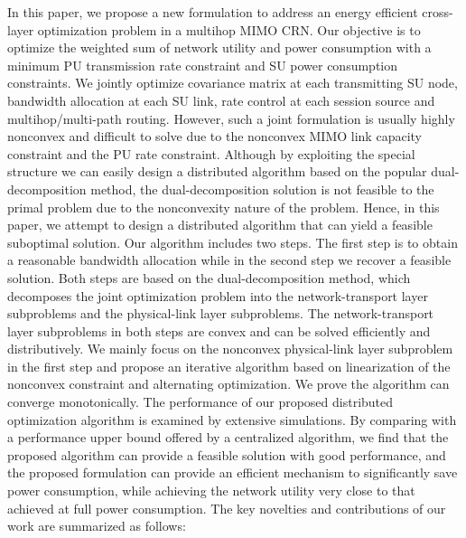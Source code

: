 \documentclass[12pt,onecolumn,tworows]{IEEEtran}
\begin{document}
In this paper, we propose a new formulation to address an energy efficient cross-layer optimization problem in a multihop MIMO CRN. Our objective is to optimize the weighted sum of network utility and power consumption with a minimum PU transmission rate constraint and SU power consumption constraints.
We jointly optimize covariance matrix
at each transmitting SU node, bandwidth allocation
at each SU link, rate control at each session source and multihop/multi-path routing. However, such a joint formulation is usually highly nonconvex and difficult to solve due to the nonconvex MIMO link capacity constraint and the PU rate constraint. Although by exploiting the special structure we can easily design a distributed algorithm based on the popular dual-decomposition method, the dual-decomposition solution is not feasible to the primal problem due to the nonconvexity nature of the problem. Hence, in this paper, we attempt to design a distributed algorithm that can yield a feasible suboptimal solution. Our algorithm includes two steps. The first step is to obtain a reasonable bandwidth allocation while in the second step we recover a feasible solution. Both steps are based on the dual-decomposition method, which decomposes the joint optimization problem into the network-transport layer subproblems and the physical-link layer subproblems. The network-transport layer subproblems in both steps are convex and can be solved efficiently and distributively. We mainly focus on the nonconvex physical-link layer subproblem in the first step and propose an iterative algorithm based on linearization of the nonconvex constraint and alternating optimization. We prove the algorithm can converge monotonically. The performance of our proposed distributed optimization algorithm is examined by extensive simulations. By comparing with a performance upper bound offered by a centralized algorithm, we find that the proposed algorithm can provide a feasible solution with good performance, and the proposed formulation can provide an efficient mechanism to significantly save power consumption, while achieving the network utility very close to that achieved at full power consumption.
The key novelties and contributions of our work are summarized as follows:
\end{document}
